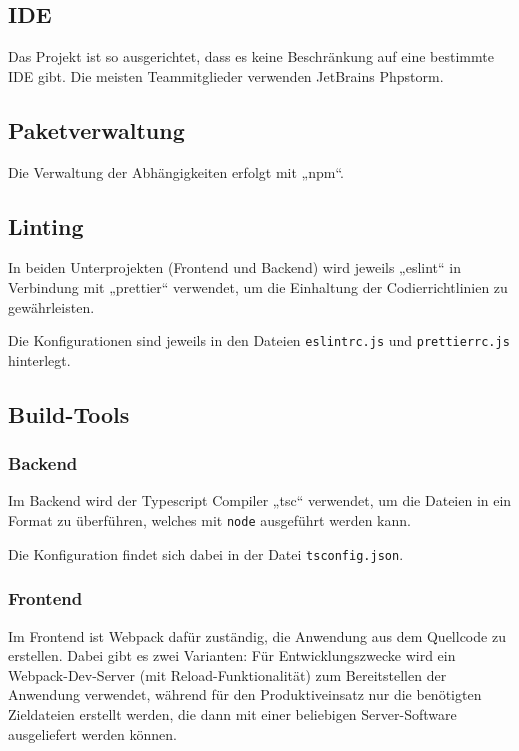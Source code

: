 \documentclass[letterpaper, 10 pt, conference]{ieeeconf}
\begin{document}
\subsection{IDE}

Das Projekt ist so ausgerichtet, dass es keine Beschränkung auf eine bestimmte IDE gibt.
Die meisten Teammitglieder verwenden JetBrains Phpstorm.

\subsection{Paketverwaltung}

Die Verwaltung der Abhängigkeiten erfolgt mit „npm“.

\subsection{Linting}

In beiden Unterprojekten (Frontend und Backend) wird jeweils „eslint“ in Verbindung mit „prettier“ verwendet,
um die Einhaltung der Codierrichtlinien zu gewährleisten.

Die Konfigurationen sind jeweils in den Dateien \texttt{eslintrc.js} und \texttt{prettierrc.js} hinterlegt.

\subsection{Build-Tools}

\subsubsection{Backend}

Im Backend wird der Typescript Compiler „tsc“ verwendet, um die Dateien in ein Format zu überführen,
welches mit \texttt{node} ausgeführt werden kann.

Die Konfiguration findet sich dabei in der Datei \texttt{tsconfig.json}.

\subsubsection{Frontend}

Im Frontend ist Webpack dafür zuständig, die Anwendung aus dem Quellcode zu erstellen.
Dabei gibt es zwei Varianten:
Für Entwicklungszwecke wird ein Webpack-Dev-Server (mit Reload-Funktionalität) zum Bereitstellen der Anwendung verwendet,
während für den Produktiveinsatz nur die benötigten Zieldateien erstellt werden, die dann mit einer beliebigen Server-Software ausgeliefert werden können.
\end{document}
